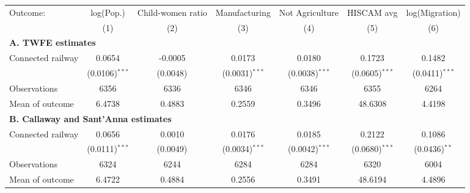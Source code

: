 \begin{tabular}{lcccccc}
  \toprule
  Outcome: & log(Pop.) & Child-women ratio & Manufacturing & Not Agriculture & HISCAM avg & log(Migration) \\
           & (1) & (2) & (3) & (4) & (5) & (6) \\
  \midrule
  \multicolumn{7}{l}{\textbf{A. TWFE estimates}}\\
  Connected railway &  0.0654 & -0.0005 & 0.0173 & 0.0180 & 0.1723 & 0.1482  \\
                    &  (0.0106)$^{***}$ & (0.0048)$^{}$ & (0.0031)$^{***}$ & (0.0038)$^{***}$ & (0.0605)$^{***}$ & (0.0411)$^{***}$  \\
  \cmidrule(lr){2-7}
  Observations      &  6356 & 6336 & 6346 & 6346 & 6355 & 6264  \\
  Mean of outcome   &  6.4738 & 0.4883 & 0.2559 & 0.3496 & 48.6308 & 4.4198  \\
  \midrule
  \multicolumn{7}{l}{\textbf{B. Callaway and Sant'Anna estimates}}\\
  Connected railway &  0.0656 & 0.0010 & 0.0176 & 0.0185 & 0.2122 & 0.1086  \\
                    &  (0.0111)$^{***}$ & (0.0049)$^{}$ & (0.0034)$^{***}$ & (0.0042)$^{***}$ & (0.0680)$^{***}$ & (0.0436)$^{**}$  \\
  \cmidrule(lr){2-7}
  Observations      &  6324 & 6244 & 6284 & 6284 & 6320 & 6004  \\
  Mean of outcome   &  6.4722 & 0.4884 & 0.2556 & 0.3491 & 48.6194 & 4.4896  \\
  \bottomrule
\end{tabular}
